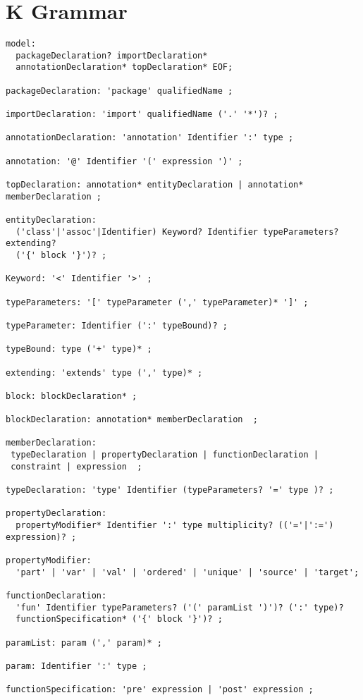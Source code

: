\newpage
\section{K Grammar}
\label{app:grammar}

{\scriptsize 

\begin{verbatim}
model: 
  packageDeclaration? importDeclaration*  
  annotationDeclaration* topDeclaration* EOF;

packageDeclaration: 'package' qualifiedName ;

importDeclaration: 'import' qualifiedName ('.' '*')? ;

annotationDeclaration: 'annotation' Identifier ':' type ;

annotation: '@' Identifier '(' expression ')' ;

topDeclaration: annotation* entityDeclaration | annotation* memberDeclaration ;

entityDeclaration: 
  ('class'|'assoc'|Identifier) Keyword? Identifier typeParameters? extending? 
  ('{' block '}')? ;

Keyword: '<' Identifier '>' ;

typeParameters: '[' typeParameter (',' typeParameter)* ']' ;

typeParameter: Identifier (':' typeBound)? ;

typeBound: type ('+' type)* ;
      
extending: 'extends' type (',' type)* ;

block: blockDeclaration* ;

blockDeclaration: annotation* memberDeclaration  ;

memberDeclaration:
 typeDeclaration | propertyDeclaration | functionDeclaration | 
 constraint | expression  ;

typeDeclaration: 'type' Identifier (typeParameters? '=' type )? ;

propertyDeclaration:
  propertyModifier* Identifier ':' type multiplicity? (('='|':=') expression)? ;

propertyModifier: 
  'part' | 'var' | 'val' | 'ordered' | 'unique' | 'source' | 'target';

functionDeclaration:
  'fun' Identifier typeParameters? ('(' paramList ')')? (':' type)?
  functionSpecification* ('{' block '}')? ;

paramList: param (',' param)* ;

param: Identifier ':' type ;

functionSpecification: 'pre' expression | 'post' expression ;


\end{verbatim}}
